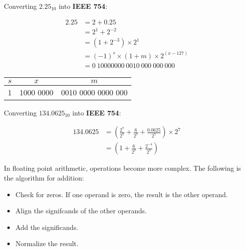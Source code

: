 

Converting $2.25_{10}$ into \textbf{IEEE 754}:

\begin{align*}
  2.25 &= 2 + 0.25\\
       &= 2^1 + 2^{-2}\\
       &= (1 + 2^{-3}) \times 2^1\\
       &= (-1)^s \times (1 + m) \times 2^{(x-127)} \\
       &= 0\ 10000000\ 0010\ 000\ 000\ 000
\end{align*}
\begin{center}
\begin{tabular}{c|c|c}
 $s$ & $x$ & $m$       \\ \hline
1        & 1000 0000           & 0010 0000 0000 000 \\
\end{tabular}
\end{center}

Converting $134.0625_{10}$ into \textbf{IEEE 754}:

\begin{align*}
  134.0625 &= \left(\frac{2^7}{2^7} + \frac{6}{2^7} + \frac{0.0625}{2^7}\right) \times 2^7\\
           &= (1 + \frac{6}{2^{7}} + \frac{2^{-4}}{2^7})
\end{align*}

In floating point arithmetic, operations become more complex. The following is the algorithm for addition:

\begin{itemize}
  \item Check for zeros. If one operand is zero, the result is the other operand.
  \item Align the signifcands of the other operands.
  \item Add the significands.
  \item Normalize the result.
\end{itemize}




